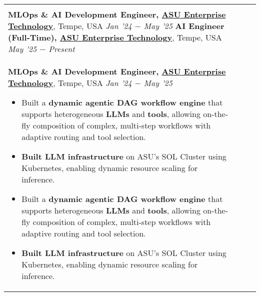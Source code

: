 \documentclass[10pt,a4]{article}
\begin{document}
{\begin{tabu}
\begin{center}
\begin{tabular} {p{} p{} p{} p{}}
\begin{flushleft}
    \vspace{1.5mm}
    \hspace{1.5mm} \textbf{\large AI Engineer (Full-Time), \href{https://ai.asu.edu/ai-tools/ai-acceleration-team}{ASU Enterprise Technology}}, Tempe, USA \hfill \textit{\large May '25 $-$ Present} \\
    \hspace{1.5mm} \textbf{\large MLOps \& AI Development Engineer, \href{https://ai.asu.edu/ai-tools/ai-acceleration-team}{ASU Enterprise Technology}}, Tempe, USA \hfill \textit{\large Jan '24 $-$ May '25}
    \hspace{1.5mm} \textbf{\large AI Engineer (Full-Time), \href{https://ai.asu.edu/ai-tools/ai-acceleration-team}{ASU Enterprise Technology}}, Tempe, USA \hfill \textit{\large May '25 $-$ Present} \\
    \hspace{1.5mm} \textbf{\large MLOps \& AI Development Engineer, \href{https://ai.asu.edu/ai-tools/ai-acceleration-team}{ASU Enterprise Technology}}, Tempe, USA \hfill \textit{\large Jan '24 $-$ May '25}
    \begin{itemize}
        \item Built a \textbf{dynamic agentic DAG workflow engine} that supports heterogeneous \textbf{LLMs} and \textbf{tools}, allowing on-the-fly composition of complex, multi-step workflows with adaptive routing and tool selection.
        \item \textbf{Built LLM infrastructure} on ASU’s SOL Cluster using Kubernetes, enabling dynamic resource scaling for inference.
        \item Built a \textbf{dynamic agentic DAG workflow engine} that supports heterogeneous \textbf{LLMs} and \textbf{tools}, allowing on-the-fly composition of complex, multi-step workflows with adaptive routing and tool selection.
        \item \textbf{Built LLM infrastructure} on ASU’s SOL Cluster using Kubernetes, enabling dynamic resource scaling for inference.

\end{itemize}
\end{flushleft}
\end{tabular}
\end{center}
\end{tabu}}
\end{document}
